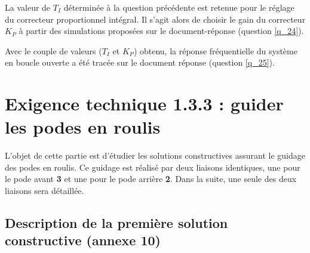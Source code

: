 \ifprof
\begin{corrige}
\end{corrige}
\else
\fi


La valeur de $T_I$ déterminée à la question précédente est retenue pour le réglage du correcteur proportionnel intégral. Il s’agit alors de choisir le gain du correcteur $K_P$ à partir des simulations proposées sur le document-réponse (question \ref{q_24}).

\ifprof
\begin{corrige}
\end{corrige}
\else
\fi


Avec le couple de valeurs ($T_I$ et $K_P$) obtenu, la réponse fréquentielle du système en boucle ouverte a été tracée sur le document réponse (question \ref{q_25}).

\ifprof
\begin{corrige}
\end{corrige}
\else
\fi


\section{Exigence technique 1.3.3 : guider les podes en roulis}

L’objet de cette partie est d’étudier les solutions constructives assurant le guidage des podes en roulis. Ce guidage est réalisé par deux liaisons identiques, une pour le pode avant \textbf{3} et une pour le pode arrière \textbf{2}. Dans la suite, une seule des deux liaisons sera détaillée.

\subsection{Description de la première solution constructive (annexe 10)}

